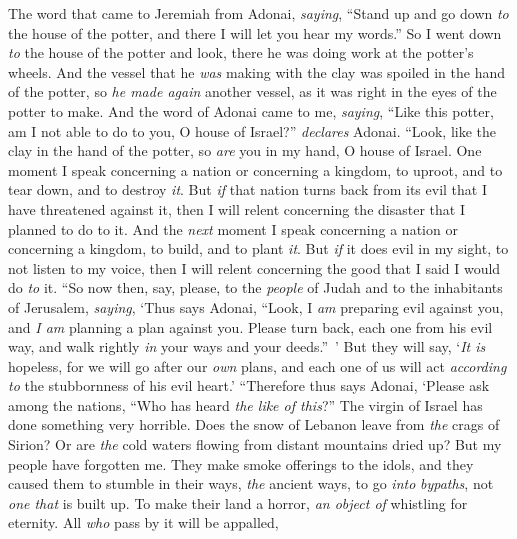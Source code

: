 \begin{biblechapter} %
 The word that came to Jeremiah from Adonai, \textit{saying},
\verse “Stand up and go down \textit{to} the house of the potter, and there I will let you hear my words.”
\verse So I went down \textit{to} the house of the potter and look, there he was doing work at the potter’s wheels.
\verse And the vessel that he \textit{was} making with the clay was spoiled in the hand of the potter, so \textit{he made again} another vessel, as it was right in the eyes of the potter to make.
\verse And the word of Adonai came to me, \textit{saying},
\verse “Like this potter, am I not able to do to you, O house of Israel?” \textit{declares} Adonai. “Look, like the clay in the hand of the potter, so \textit{are} you in my hand, O house of Israel.
\verse One moment I speak concerning a nation or concerning a kingdom, to uproot, and to tear down, and to destroy \textit{it}.
\verse But \textit{if} that nation turns back from its evil that I have threatened against it, then I will relent concerning the disaster that I planned to do to it.
\verse And the \textit{next} moment I speak concerning a nation or concerning a kingdom, to build, and to plant \textit{it}.
\verse But \textit{if} it does evil in my sight, to not listen to my voice, then I will relent concerning the good that I said I would do \textit{to} it.
\verse “So now then, say, please, to the \textit{people} of Judah and to the inhabitants of Jerusalem, \textit{saying}, ‘Thus says Adonai, “Look, I \textit{am} preparing evil against you, and \textit{I am} planning a plan against you. Please turn back, each one from his evil way, and walk rightly \textit{in} your ways and your deeds.” ’
\verse But they will say, ‘\textit{It is} hopeless, for we will go after our \textit{own} plans, and each one of us will act \textit{according to} the stubbornness of his evil heart.’
\verse “Therefore thus says Adonai,
\verse ‘Please ask among the nations, “Who has heard \textit{the like of this}?” 
The virgin of Israel has done something very horrible.
\verse Does the snow of Lebanon leave from \textit{the} crags of Sirion? 
Or are \textit{the} cold waters flowing from distant mountains dried up?
\verse But my people have forgotten me. 
They make smoke offerings to the idols, 
and they caused them to stumble in their ways, \textit{the} ancient ways, 
to go \textit{into} \textit{bypaths}, not \textit{one that} is built up.
\verse To make their land a horror, 
\textit{an object of} whistling for eternity. 
All \textit{who} pass by it will be appalled, 

\end{biblechapter}
